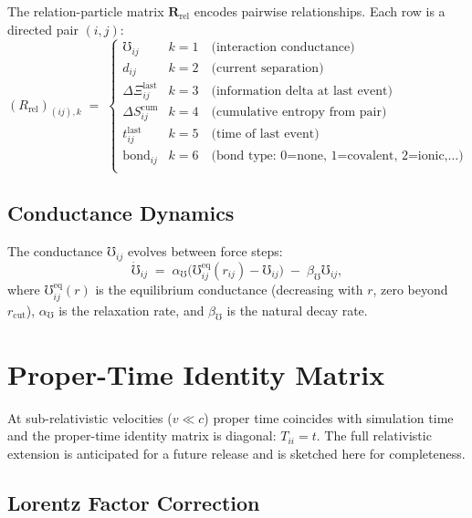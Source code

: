 \documentclass[11pt,a4paper]{article}
\newcommand{\Rec}{\Xi}
\newcommand{\Cond}{\mho}
\begin{document}
The relation-particle matrix $\mathbf{R}_{\mathrm{rel}}$ encodes pairwise
relationships.  Each row is a directed pair $(i, j)$:
\[
  (R_{\mathrm{rel}})_{(ij),k} \;=\;
  \begin{cases}
    \Cond_{ij}       & k=1 \quad\text{(interaction conductance)} \\
    d_{ij}            & k=2 \quad\text{(current separation)} \\
    \Delta\Rec_{ij}^{\mathrm{last}} & k=3 \quad\text{(information delta at last event)} \\
    \Delta S_{ij}^{\mathrm{cum}}    & k=4 \quad\text{(cumulative entropy from pair)} \\
    t_{ij}^{\mathrm{last}}          & k=5 \quad\text{(time of last event)} \\
    \mathrm{bond}_{ij}              & k=6 \quad\text{(bond type: 0=none, 1=covalent, 2=ionic,\ldots)} \\
  \end{cases}
\]

\subsection{Conductance Dynamics}

The conductance $\Cond_{ij}$ evolves between force steps:
\[
  \dot{\Cond}_{ij} \;=\;
  \alpha_{\Cond} \bigl(
    \Cond_{ij}^{\mathrm{eq}}(r_{ij}) - \Cond_{ij}
  \bigr)
  \;-\; \beta_{\Cond} \Cond_{ij} ,
\]
where $\Cond_{ij}^{\mathrm{eq}}(r)$ is the equilibrium conductance
(decreasing with $r$, zero beyond $r_{\mathrm{cut}}$), $\alpha_{\Cond}$
is the relaxation rate, and $\beta_{\Cond}$ is the natural decay rate.

\section{Proper-Time Identity Matrix}\label{sec:propertime}

At sub-relativistic velocities ($v \ll c$) proper time coincides with
simulation time and the proper-time identity matrix is diagonal:
$T_{ii} = t$.  The full relativistic extension is anticipated for a
future release and is sketched here for completeness.

\subsection{Lorentz Factor Correction}
\end{document}
